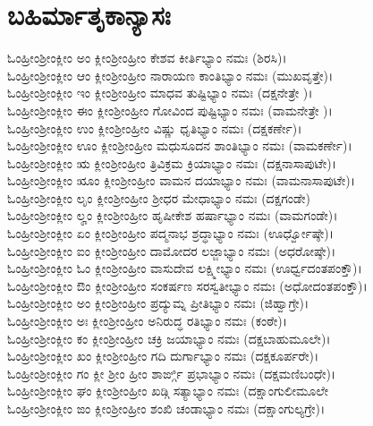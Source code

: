 \section{ಬಹಿರ್ಮಾತೃಕಾನ್ಯಾಸಃ}
ಓಂಹ್ರೀಂಶ್ರೀಂಕ್ಲೀಂ ಅಂ ಕ್ಲೀಂಶ್ರೀಂಹ್ರೀಂ ಕೇಶವ ಕೀರ್ತಿಭ್ಯಾಂ ನಮಃ (ಶಿರಸಿ)।\\
ಓಂಹ್ರೀಂಶ್ರೀಂಕ್ಲೀಂ ಆಂ ಕ್ಲೀಂಶ್ರೀಂಹ್ರೀಂ ನಾರಾಯಣ ಕಾಂತಿಭ್ಯಾಂ ನಮಃ (ಮುಖವೃತ್ತೇ)।\\
ಓಂಹ್ರೀಂಶ್ರೀಂಕ್ಲೀಂ ಇಂ ಕ್ಲೀಂಶ್ರೀಂಹ್ರೀಂ ಮಾಧವ ತುಷ್ಟಿಭ್ಯಾಂ ನಮಃ (ದಕ್ಷನೇತ್ರೇ )।\\
ಓಂಹ್ರೀಂಶ್ರೀಂಕ್ಲೀಂ ಈಂ ಕ್ಲೀಂಶ್ರೀಂಹ್ರೀಂ ಗೋವಿಂದ ಪುಷ್ಟಿಭ್ಯಾಂ ನಮಃ (ವಾಮನೇತ್ರೇ )।\\
ಓಂಹ್ರೀಂಶ್ರೀಂಕ್ಲೀಂ ಉಂ ಕ್ಲೀಂಶ್ರೀಂಹ್ರೀಂ ವಿಷ್ಣು ಧೃತಿಭ್ಯಾಂ ನಮಃ (ದಕ್ಷಕರ್ಣೇ)।\\
ಓಂಹ್ರೀಂಶ್ರೀಂಕ್ಲೀಂ ಊಂ ಕ್ಲೀಂಶ್ರೀಂಹ್ರೀಂ ಮಧುಸೂದನ ಶಾಂತಿಭ್ಯಾಂ ನಮಃ (ವಾಮಕರ್ಣೇ)।\\
ಓಂಹ್ರೀಂಶ್ರೀಂಕ್ಲೀಂ ಋ ಕ್ಲೀಂಶ್ರೀಂಹ್ರೀಂ ತ್ರಿವಿಕ್ರಮ ಕ್ರಿಯಾಭ್ಯಾಂ ನಮಃ (ದಕ್ಷನಾಸಾಪುಟೇ)।\\
ಓಂಹ್ರೀಂಶ್ರೀಂಕ್ಲೀಂ ೠಂ ಕ್ಲೀಂಶ್ರೀಂಹ್ರೀಂ ವಾಮನ ದಯಾಭ್ಯಾಂ ನಮಃ (ವಾಮನಾಸಾಪುಟೇ)।\\
ಓಂಹ್ರೀಂಶ್ರೀಂಕ್ಲೀಂ ಲೃಂ ಕ್ಲೀಂಶ್ರೀಂಹ್ರೀಂ ಶ್ರೀಧರ ಮೇಧಾಭ್ಯಾಂ ನಮಃ (ದಕ್ಷಗಂಡೇ)\\
ಓಂಹ್ರೀಂಶ್ರೀಂಕ್ಲೀಂ ಲೄಂ ಕ್ಲೀಂಶ್ರೀಂಹ್ರೀಂ ಹೃಷೀಕೇಶ ಹರ್ಷಾಭ್ಯಾಂ ನಮಃ (ವಾಮಗಂಡೇ)।\\
ಓಂಹ್ರೀಂಶ್ರೀಂಕ್ಲೀಂ ಏಂ ಕ್ಲೀಂಶ್ರೀಂಹ್ರೀಂ ಪದ್ಮನಾಭ ಶ್ರದ್ಧಾಭ್ಯಾಂ ನಮಃ (ಊರ್ಧ್ವೋಷ್ಠೇ)।\\
ಓಂಹ್ರೀಂಶ್ರೀಂಕ್ಲೀಂ ಐಂ ಕ್ಲೀಂಶ್ರೀಂಹ್ರೀಂ ದಾಮೋದರ ಲಜ್ಜಾಭ್ಯಾಂ ನಮಃ (ಅಧರೋಷ್ಠೇ)।\\
ಓಂಹ್ರೀಂಶ್ರೀಂಕ್ಲೀಂ ಓಂ ಕ್ಲೀಂಶ್ರೀಂಹ್ರೀಂ ವಾಸುದೇವ ಲಕ್ಷ್ಮೀಭ್ಯಾಂ ನಮಃ (ಊರ್ಧ್ವದಂತಪಂಕ್ತೌ)।\\
ಓಂಹ್ರೀಂಶ್ರೀಂಕ್ಲೀಂ ಔಂ ಕ್ಲೀಂಶ್ರೀಂಹ್ರೀಂ ಸಂಕರ್ಷಣ ಸರಸ್ವತೀಭ್ಯಾಂ ನಮಃ (ಅಧೋದಂತಪಂಕ್ತೌ)।\\
ಓಂಹ್ರೀಂಶ್ರೀಂಕ್ಲೀಂ ಅಂ ಕ್ಲೀಂಶ್ರೀಂಹ್ರೀಂ ಪ್ರದ್ಯುಮ್ನ ಪ್ರೀತಿಭ್ಯಾಂ ನಮಃ (ಜಿಹ್ವಾಗ್ರೇ)।\\
ಓಂಹ್ರೀಂಶ್ರೀಂಕ್ಲೀಂ ಅಃ ಕ್ಲೀಂಶ್ರೀಂಹ್ರೀಂ ಅನಿರುದ್ಧ ರತಿಭ್ಯಾಂ ನಮಃ (ಕಂಠೇ)।\\
ಓಂಹ್ರೀಂಶ್ರೀಂಕ್ಲೀಂ ಕಂ ಕ್ಲೀಂಶ್ರೀಂಹ್ರೀಂ ಚಕ್ರಿ ಜಯಾಭ್ಯಾಂ ನಮಃ (ದಕ್ಷಬಾಹುಮೂಲೇ)।\\
ಓಂಹ್ರೀಂಶ್ರೀಂಕ್ಲೀಂ ಖಂ ಕ್ಲೀಂಶ್ರೀಂಹ್ರೀಂ ಗದಿ ದುರ್ಗಾಭ್ಯಾಂ ನಮಃ (ದಕ್ಷಕೂರ್ಪರೇ)।\\
ಓಂಹ್ರೀಂಶ್ರೀಂಕ್ಲೀಂ ಗಂ ಕ್ಲೀ ಶ್ರೀಂ ಹ್ರೀಂ ಶಾರ್ಙ್ಗಿ ಪ್ರಭಾಭ್ಯಾಂ ನಮಃ (ದಕ್ಷಮಣಿಬಂಧೇ)।\\
ಓಂಹ್ರೀಂಶ್ರೀಂಕ್ಲೀಂ ಘಂ ಕ್ಲೀಂಶ್ರೀಂಹ್ರೀಂ ಖಡ್ಗಿ ಸತ್ಯಾಭ್ಯಾಂ ನಮಃ (ದಕ್ಷಾಂಗುಲೀಮೂಲೇ\\
ಓಂಹ್ರೀಂಶ್ರೀಂಕ್ಲೀಂ ಙಂ ಕ್ಲೀಂಶ್ರೀಂಹ್ರೀಂ ಶಂಖಿ ಚಂಡಾಭ್ಯಾಂ ನಮಃ (ದಕ್ಷಾಂಗುಲ್ಯಗ್ರೇ)।\\
